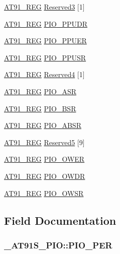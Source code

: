 \begin{CompactItemize}
\hyperlink{AT91SAM7X256_8h_712ad5a1ac1bd02f3e95a7526c283ce1}{AT91\_\-REG} \hyperlink{struct__AT91S__PIO_d2620a66d1ff140dabc2d6ea26c837a9}{Reserved3} \mbox{[}1\mbox{]}
\item 
\hyperlink{AT91SAM7X256_8h_712ad5a1ac1bd02f3e95a7526c283ce1}{AT91\_\-REG} \hyperlink{struct__AT91S__PIO_13486a9a19a3b6bea5e1b48eddb00e66}{PIO\_\-PPUDR}
\item 
\hyperlink{AT91SAM7X256_8h_712ad5a1ac1bd02f3e95a7526c283ce1}{AT91\_\-REG} \hyperlink{struct__AT91S__PIO_79beafff21463b90ed761353a33e6b32}{PIO\_\-PPUER}
\item 
\hyperlink{AT91SAM7X256_8h_712ad5a1ac1bd02f3e95a7526c283ce1}{AT91\_\-REG} \hyperlink{struct__AT91S__PIO_69c2f363f47de55fe0e8c63ab24e323c}{PIO\_\-PPUSR}
\item 
\hyperlink{AT91SAM7X256_8h_712ad5a1ac1bd02f3e95a7526c283ce1}{AT91\_\-REG} \hyperlink{struct__AT91S__PIO_826b47fcd00f5cc0e24e4dd1d945ee62}{Reserved4} \mbox{[}1\mbox{]}
\item 
\hyperlink{AT91SAM7X256_8h_712ad5a1ac1bd02f3e95a7526c283ce1}{AT91\_\-REG} \hyperlink{struct__AT91S__PIO_533565afac018362cb6d559881ff0f13}{PIO\_\-ASR}
\item 
\hyperlink{AT91SAM7X256_8h_712ad5a1ac1bd02f3e95a7526c283ce1}{AT91\_\-REG} \hyperlink{struct__AT91S__PIO_64dfd9798a49e4d95a3f032bd285579f}{PIO\_\-BSR}
\item 
\hyperlink{AT91SAM7X256_8h_712ad5a1ac1bd02f3e95a7526c283ce1}{AT91\_\-REG} \hyperlink{struct__AT91S__PIO_f640c29856ea42d101514823cb819efa}{PIO\_\-ABSR}
\item 
\hyperlink{AT91SAM7X256_8h_712ad5a1ac1bd02f3e95a7526c283ce1}{AT91\_\-REG} \hyperlink{struct__AT91S__PIO_c88b41ba83ed5fb1c7f281c88348c604}{Reserved5} \mbox{[}9\mbox{]}
\item 
\hyperlink{AT91SAM7X256_8h_712ad5a1ac1bd02f3e95a7526c283ce1}{AT91\_\-REG} \hyperlink{struct__AT91S__PIO_c5ccf9a9b596512f34e6c324b406e071}{PIO\_\-OWER}
\item 
\hyperlink{AT91SAM7X256_8h_712ad5a1ac1bd02f3e95a7526c283ce1}{AT91\_\-REG} \hyperlink{struct__AT91S__PIO_8cbcb365dc730062e8d25307c54305f5}{PIO\_\-OWDR}
\item 
\hyperlink{AT91SAM7X256_8h_712ad5a1ac1bd02f3e95a7526c283ce1}{AT91\_\-REG} \hyperlink{struct__AT91S__PIO_0354e307d02d69c83141ba4a3b099d79}{PIO\_\-OWSR}
\end{CompactItemize}


\subsection{Field Documentation}
\hypertarget{struct__AT91S__PIO_6219ff0520bc90a0c1eef988bd253d48}{
\subsubsection{ {\bf \_\-AT91S\_\-PIO::PIO\_\-PER}}}
\label{struct__AT91S__PIO_6219ff0520bc90a0c1eef988bd253d48}




